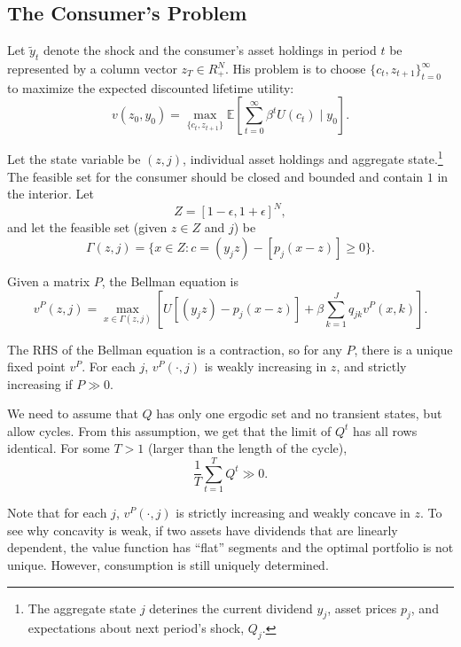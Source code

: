 \documentclass{tufte-handout}
\newcommand*\E{\mathbb{E}}
\theoremstyle{definition}
\begin{document}
\subsection{The Consumer's Problem}

Let $\tilde{y}_t$ denote the shock and the consumer's asset holdings in period $t$ be represented by a column vector $z_T \in R_+^N$. His problem is to choose $\{c_t, z_{t+1}\}_{t=0}^{\infty}$ to maximize the expected discounted lifetime utility: \[
	v(z_0,y_0) = \max_{\{c_t,z_{t+1}\}} \E\left[ \sum\limits_{t=0}^{\infty} \beta^{t} U(c_t) \mid y_0\right] 
.\] 

Let the state variable be $(z,j)$, individual asset holdings and aggregate state.\footnote{The aggregate state $j$ deterines the current dividend $y_j$, asset prices $p_j$, and expectations about next period's shock, $Q_j$.} The feasible set for the consumer should be closed and bounded and contain $1$ in the interior. Let \[
	Z = \left[ 1-\epsilon,1+\epsilon \right]^{N}
	,\] and let the feasible set (given $z \in Z$ and $j$) be \[
	\Gamma(z,j) = \{x\in Z : c= (y_j z) - \left[ p_j (x-z) \right] \ge 0\}
.\] 

Given a matrix $P$, the Bellman equation is \[
	v^P(z,j) = \max_{x \in \Gamma(z,j)} \left[ U\left[ (y_j z) - p_j(x-z) \right] + \beta \sum\limits_{k=1}^{J} q_{jk}v^P(x,k) \right]
.\] 

 The RHS of the Bellman equation is a contraction, so for any $P$, there is a unique fixed point $v^P$. For each $j$, $v^P(\cdot ,j)$ is weakly increasing in $z$, and strictly increasing if $P \gg 0$.

We need to assume that $Q$ has only one ergodic set and no transient states, but allow cycles. From this assumption, we get that the limit of $Q^t$ has all rows identical. For some $T > 1$ (larger than the length of the cycle), \[
	\frac{1}{T} \sum\limits_{t=1}^{T}  Q^t \gg 0
.\] 

Note that for each $j$, $v^P(\cdot ,j)$ is strictly increasing and weakly concave in $z$. To see why concavity is weak, if two assets have dividends that are linearly dependent, the value function has ``flat'' segments and the optimal portfolio is not unique. However, consumption is still uniquely determined.
\end{document}
